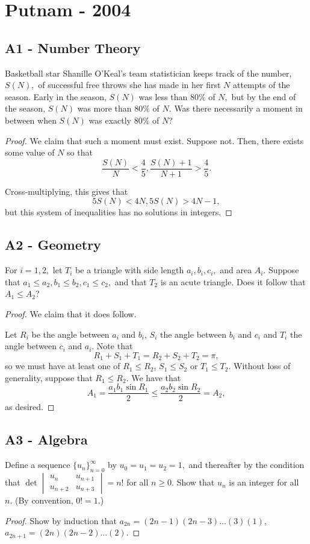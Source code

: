 \documentclass[11pt]{scrartcl}
\newcommand{\<}{\langle}
\renewcommand{\>}{\rangle}
\begin{document}
\section{Putnam - 2004} 
\subsection{A1 - Number Theory}
Basketball star Shanille O'Keal's team statistician keeps track of the number, $S(N),$ of successful free throws she has made in her first $N$ attempts of the season. Early in the season, $S(N)$ was less than $80\%$ of $N,$ but by the end of the season, $S(N)$ was more than $80\%$ of $N.$ Was there necessarily a moment in between when $S(N)$ was exactly $80\%$ of $N$?
\begin{proof}
We claim that such a moment must exist.  Suppose not.  Then, there exists some value of $N$ so that 
$$\frac{S(N)}{N} < \frac{4}{5}, \frac{S(N) + 1}{N + 1} > \frac{4}{5}.$$

Cross-multiplying, this gives that $$5S(N) < 4N, 5S(N) > 4N -1,$$
but this system of inequalities has no solutions in integers.  
\end{proof}
\pagebreak
\subsection{A2 - Geometry}
For $i=1,2,$ let $T_i$ be a triangle with side length $a_i,b_i,c_i,$ and area $A_i.$ Suppose that $a_1\le a_2, b_1\le b_2, c_1\le c_2,$ and that $T_2$ is an acute triangle. Does it follow that $A_1\le A_2$?
\begin{proof}
We claim that it does follow.

Let $R_i$ be the angle between $a_i$ and $b_i$, $S_i$ the angle between $b_i$ and $c_i$ and $T_i$ the angle between $c_i$ and $a_i$.  Note that 
$$R_1 + S_1 + T_1 = R_2 + S_2 + T_2 = \pi,$$
so we must have at least one of $R_1 \le R_2$, $S_1 \le S_2$ or $T_1 \le T_2$.  Without loss of generality, suppose that $R_1 \le R_2$.  We have that 
$$A_1 = \frac{a_1b_1 \sin R_1}{2} \le \frac{a_2 b_2 \sin R_2}{2} = A_2,$$
as desired.
\end{proof}
\pagebreak
\subsection{A3 - Algebra}
Define a sequence $\{u_n\}_{n=0}^{\infty}$ by $u_0=u_1=u_2=1,$ and thereafter by the condition that
$\det\begin{vmatrix} u_n & u_{n+1} \\ u_{n+2} & u_{n+3} \end{vmatrix}=n!$
for all $n\ge 0.$ Show that $u_n$ is an integer for all $n.$ (By convention, $0!=1$.)
\begin{proof}
Show by induction that $a_{2n} = (2n-1)(2n-3) \dots (3)(1)$, $a_{2n+1} = (2n)(2n-2)\dots(2)$.
\end{proof}
\pagebreak
\end{document}

